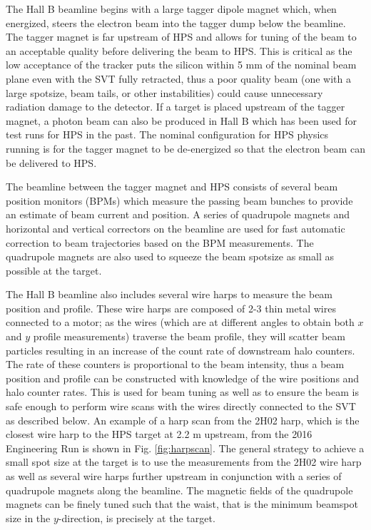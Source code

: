 The Hall B beamline begins with a large tagger dipole magnet which, when energized, steers the electron beam into the tagger dump below the beamline. The tagger magnet is far upstream of HPS and allows for tuning of the beam to an acceptable quality before delivering the beam to HPS. This is critical as the low acceptance of the tracker puts the silicon within 5 mm of the nominal beam plane even with the SVT fully retracted, thus a poor quality beam (one with a large spotsize, beam tails, or other instabilities) could cause unnecessary radiation damage to the detector. If a target is placed upstream of the tagger magnet, a photon beam can also be produced in Hall B which has been used for test runs for HPS in the past. The nominal configuration for HPS physics running is for the tagger magnet to be de-energized so that the electron beam can be delivered to HPS.

The beamline between the tagger magnet and HPS consists of several beam position monitors (BPMs) which measure the passing beam bunches to provide an estimate of beam current and position. A series of quadrupole magnets and horizontal and vertical correctors on the beamline are used for fast automatic correction to beam trajectories based on the BPM measurements. The quadrupole magnets are also used to squeeze the beam spotsize as small as possible at the target.

The Hall B beamline also includes several wire harps to measure the beam position and profile. These wire harps are composed of 2-3 thin metal wires connected to a motor; as the wires (which are at different angles to obtain both $x$ and $y$ profile measurements) traverse the beam profile, they will scatter beam particles resulting in an increase of the count rate of downstream halo counters. The rate of these counters is proportional to the beam intensity, thus a beam position and profile can be constructed with knowledge of the wire positions and halo counter rates. This is used for beam tuning as well as to ensure the beam is safe enough to perform wire scans with the wires directly connected to the SVT as described below. An example of a harp scan from the 2H02 harp, which is the closest wire harp to the HPS target at 2.2 m upstream, from the 2016 Engineering Run is shown in Fig. \ref{fig:harpscan}. The general strategy to achieve a small spot size at the target is to use the measurements from the 2H02 wire harp as well as several wire harps further upstream in conjunction with a series of quadrupole magnets along the beamline. The magnetic fields of the quadrupole magnets can be finely tuned such that the waist, that is the minimum beamspot size in the $y$-direction, is precisely at the target.

